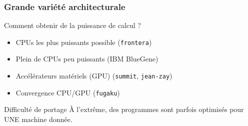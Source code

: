 \documentclass[xcolor={x11names,svgnames}]{beamer}
\begin{document}

\begin{frame}
  \frametitle{Grande variété architecturale}

  \begin{block}{Comment obtenir de la puissance de calcul ?}
    \begin{itemize}
    \item CPUs les plus puissants possible (\texttt{frontera})
    \item Plein de CPUs peu puissants (IBM BlueGene)
    \item Accélérateurs matériels (GPU) (\texttt{summit}, \texttt{jean-zay})
    \item Convergence CPU/GPU (\texttt{fugaku})
    \end{itemize}
  \end{block}

  \bigskip

  \begin{alertblock}{Difficulté de portage}
    À l'extrême, des programmes sont parfois optimisés pour UNE machine donnée.
  \end{alertblock}  
\end{frame}



\end{document}
